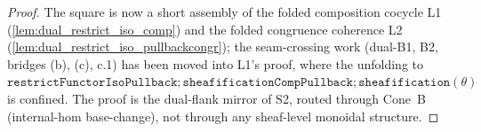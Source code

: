 \begin{proof}
  \leanok
  The square is now a short assembly of the folded composition cocycle L1
  (\cref{lem:dual_restrict_iso_comp}) and the folded congruence coherence L2
  (\cref{lem:dual_restrict_iso_pullbackcongr}); the seam-crossing work (dual-B1, B2, bridges (b), (c),
  c.1) has been moved into L1's proof, where the unfolding to
  \(\mathtt{restrictFunctorIsoPullback} \mathbin{;} \mathtt{sheafificationCompPullback}
  \mathbin{;} \mathtt{sheafification}(\theta)\) is confined. The proof is the dual-flank mirror of S2,
  routed through Cone~B (internal-hom base-change), not through any sheaf-level monoidal structure.


\end{proof}
